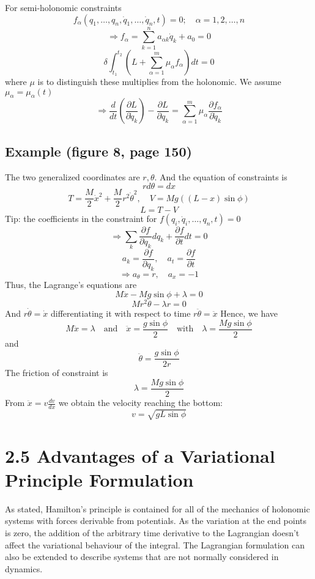 \documentclass[12pt]{article}
\begin{document}
	For semi-holonomic constraints
	$$ f_{\alpha}(q_1, \dots, q_n, \dot{q}_1, \dots, \dot{q}_n, t) = 0; \quad \alpha = 1, 2, \dots, n $$
	$$ \Rightarrow f_{\alpha} = \sum_{k=1}^{n} a_{\alpha k} \dot{q}_k + a_0 = 0 $$
	$$ \delta \int_{t_1}^{t_2} (L + \sum_{\alpha=1}^{m} \mu_{\alpha} f_{\alpha}) dt = 0 $$
	where $\mu$ is to distinguish these multiplies from the holonomic.
	We assume $\mu_{\alpha} = \mu_{\alpha}(t)$
	$$ \Rightarrow \frac{d}{dt}(\frac{\partial L}{\partial \dot{q}_k}) - \frac{\partial L}{\partial q_k} = \sum_{\alpha=1}^{m} \mu_{\alpha} \frac{\partial f_{\alpha}}{\partial \dot{q}_k} $$
	
	\subsection*{Example (figure 8, page 150)}
	The two generalized coordinates are $r, \theta$.
	And the equation of constraints is
	$$ r d\theta = dx $$
	$$ T = \frac{M}{2}\dot{x}^2 + \frac{M}{2}r^2\dot{\theta}^2, \quad V=Mg((L-x)\sin\phi) $$
	$$ L = T-V $$
	Tip: the coefficients in the constraint
	for $f(q_i, \dot{q}_i, \dots, q_n, t) = 0$
	$$ \Rightarrow \sum_k \frac{\partial f}{\partial q_k} dq_k + \frac{\partial f}{\partial t} dt = 0 $$
	$$ a_k = \frac{\partial f}{\partial q_k}, \quad a_t = \frac{\partial f}{\partial t} $$
	$$ \Rightarrow a_\theta = r, \quad a_x = -1 $$
	Thus, the Lagrange's equations are
	$$ M\ddot{x} - Mg\sin\phi + \lambda = 0 $$
	$$ Mr^2\ddot{\theta} - \lambda r = 0 $$
	And $r\dot{\theta} = \dot{x}$ differentiating it with respect to time $r\ddot{\theta} = \ddot{x}$
	Hence, we have
	$$ M\ddot{x} = \lambda \quad \text{and} \quad \ddot{x} = \frac{g\sin\phi}{2} \quad \text{with} \quad \lambda = \frac{Mg\sin\phi}{2} $$
	and
	$$ \ddot{\theta} = \frac{g\sin\phi}{2r} $$
	The friction of constraint is
	$$ \lambda = \frac{Mg\sin\phi}{2} $$
	From $\ddot{x} = v \frac{dv}{dx}$ we obtain the velocity reaching the bottom:
	$$ v = \sqrt{gL\sin\phi} $$
	
	\section*{2.5 Advantages of a Variational Principle Formulation}
	
	As stated, Hamilton's principle is contained for all of the mechanics of holonomic systems with forces derivable from potentials.
	As the variation at the end points is zero, the addition of the arbitrary time derivative to the Lagrangian doesn't affect the variational behaviour of the integral.
	The Lagrangian formulation can also be extended to describe systems that are not normally considered in dynamics.
	
\end{document}
